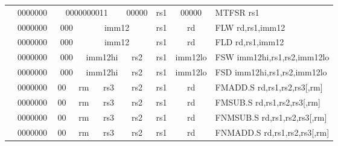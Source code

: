 \begin{table}[p]
\begin{small}
\begin{center}
\begin{tabular}{rcccccccccl}
&
\multicolumn{1}{|c|}{0000000} &
\multicolumn{5}{c|}{0000000011} &
\multicolumn{1}{c|}{00000} &
\multicolumn{1}{c|}{rs1} &
\multicolumn{1}{c|}{00000} & MTFSR rs1 \\
\cline{2-10}
  

&
\multicolumn{1}{|c|}{0000000} &
\multicolumn{2}{c|}{000} &
\multicolumn{4}{c|}{imm12} &
\multicolumn{1}{c|}{rs1} &
\multicolumn{1}{c|}{rd} & FLW rd,rs1,imm12 \\
\cline{2-10}
  

&
\multicolumn{1}{|c|}{0000000} &
\multicolumn{2}{c|}{000} &
\multicolumn{4}{c|}{imm12} &
\multicolumn{1}{c|}{rs1} &
\multicolumn{1}{c|}{rd} & FLD rd,rs1,imm12 \\
\cline{2-10}
  

&
\multicolumn{1}{|c|}{0000000} &
\multicolumn{2}{c|}{000} &
\multicolumn{3}{c|}{imm12hi} &
\multicolumn{1}{c|}{rs2} &
\multicolumn{1}{c|}{rs1} &
\multicolumn{1}{c|}{imm12lo} & FSW imm12hi,rs1,rs2,imm12lo \\
\cline{2-10}
  

&
\multicolumn{1}{|c|}{0000000} &
\multicolumn{2}{c|}{000} &
\multicolumn{3}{c|}{imm12hi} &
\multicolumn{1}{c|}{rs2} &
\multicolumn{1}{c|}{rs1} &
\multicolumn{1}{c|}{imm12lo} & FSD imm12hi,rs1,rs2,imm12lo \\
\cline{2-10}
  

&
\multicolumn{1}{|c|}{0000000} &
\multicolumn{1}{c|}{00} &
\multicolumn{2}{c|}{rm} &
\multicolumn{2}{c|}{rs3} &
\multicolumn{1}{c|}{rs2} &
\multicolumn{1}{c|}{rs1} &
\multicolumn{1}{c|}{rd} & FMADD.S rd,rs1,rs2,rs3[,rm] \\
\cline{2-10}
  

&
\multicolumn{1}{|c|}{0000000} &
\multicolumn{1}{c|}{00} &
\multicolumn{2}{c|}{rm} &
\multicolumn{2}{c|}{rs3} &
\multicolumn{1}{c|}{rs2} &
\multicolumn{1}{c|}{rs1} &
\multicolumn{1}{c|}{rd} & FMSUB.S rd,rs1,rs2,rs3[,rm] \\
\cline{2-10}
  

&
\multicolumn{1}{|c|}{0000000} &
\multicolumn{1}{c|}{00} &
\multicolumn{2}{c|}{rm} &
\multicolumn{2}{c|}{rs3} &
\multicolumn{1}{c|}{rs2} &
\multicolumn{1}{c|}{rs1} &
\multicolumn{1}{c|}{rd} & FNMSUB.S rd,rs1,rs2,rs3[,rm] \\
\cline{2-10}
  

&
\multicolumn{1}{|c|}{0000000} &
\multicolumn{1}{c|}{00} &
\multicolumn{2}{c|}{rm} &
\multicolumn{2}{c|}{rs3} &
\multicolumn{1}{c|}{rs2} &
\multicolumn{1}{c|}{rs1} &
\multicolumn{1}{c|}{rd} & FNMADD.S rd,rs1,rs2,rs3[,rm] \\
\cline{2-10}
  


\end{tabular}
\end{center}
\end{small}
\end{table}
